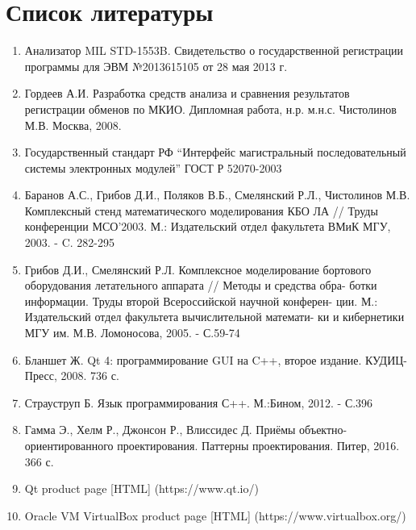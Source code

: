 \section*{Список литературы}

\begin{enumerate}
 \sloppy
 \item \label{opermon_reg} Анализатор MIL STD-1553B. Свидетельство о 
государственной регистрации программы для ЭВМ №2013615105 от 28 мая 2013 г.
 \item \label{gordeev_diploma} Гордеев А.И. Разработка средств анализа и 
сравнения результатов регистрации обменов по МКИО. Дипломная работа, н.р. 
м.н.с. Чистолинов М.В. Москва, 2008.
 \item \label{gost_r_52070-2003} Государственный стандарт РФ ``Интерфейс 
магистральный последовательный системы электронных модулей'' ГОСТ Р 52070-2003
 \item \label{stand} Баранов А.С., Грибов Д.И., Поляков В.Б., Смелянский Р.Л., 
Чистолинов М.В. Комплексный стенд математического моделирования
КБО ЛА // Труды конференции МСО'2003. М.: Издательский отдел
факультета ВМиК МГУ, 2003. - C. 282-295
 \item \label{stand2} Грибов Д.И., Смелянский Р.Л. Комплексное моделирование 
бортового оборудования летательного аппарата // Методы и средства обра-
ботки информации. Труды второй Всероссийской научной конферен-
ции. М.: Издательский отдел факультета вычислительной математи-
ки и кибернетики МГУ им. М.В. Ломоносова, 2005. - С.59-74 
 \item \label{blanshet_qt4} Бланшет Ж. Qt 4: программирование GUI на C++, 
второе издание. КУДИЦ-Пресс, 2008. 736 с.
 \item \label{straustrup} Страуструп Б. Язык программирования С++. М.:Бином, 
2012. - С.396
 \item \label{gof} Гамма Э., Хелм Р., Джонсон Р., Влиссидес Д. Приёмы 
объектно-ориентированного проектирования. Паттерны проектирования. Питер, 2016. 
366 с.
 \item \label{qt_ref} Qt product page [HTML] (https://www.qt.io/)
 \item \label{virtualbox} Oracle VM VirtualBox product page [HTML] 
(https://www.virtualbox.org/)
\end{enumerate}
